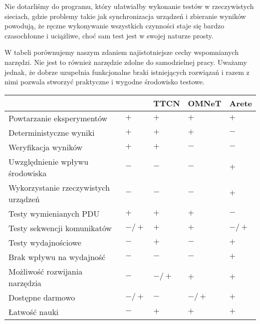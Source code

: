 \documentclass[00-praca-magisterska.tex]{subfiles}
\begin{document}
Nie dotarliśmy do programu, który ułatwiałby wykonanie testów w
rzeczywistych sieciach, gdzie problemy takie jak synchronizacja urządzeń i
zbieranie wyników powodują, że ręczne wykonywanie wszystkich czynności staje
się bardzo czasochłonne i uciążliwe, choć sam test jest w swojej naturze prosty.

W tabeli  porównujemy naszym zdaniem najistotniejsze cechy
wspomnianych narzędzi.  Nie jest to również narzędzie zdolne do
samodzielnej pracy. Uważamy jednak, że dobrze uzupełnia funkcjonalne braki
istniejących rozwiązań i razem z nimi pozwala stworzyć praktyczne i
wygodne środowisko testowe.

\begin{small}
\begin{center}
   \begin{tabular}{ l || C{1.1cm} | C{1.1cm} | C{1.1cm} | C{1.1cm}   }
      \hline
      & \small{\parbox[top][2.4em][c]{1.1cm}{}} & \small{TTCN} & \small{OMNeT} & \small{Arete} \\
      \hline
      Powtarzanie eksperymentów & $+$ & $+$ & $+$ & $+$ \\
      \hline
      Deterministyczne wyniki & $+$ & $+$ & $+$ & $-$ \\
      \hline
      Weryfikacja wyników & $+$ & $+$ & $-$ & $-$ \\
      \hline
      Uwzględnienie wpływu środowiska & $-$ & $-$ & $-$ & $+$ \\
      \hline
      Wykorzystanie rzeczywistych urządzeń & $-$ & $-$ & $-$ & $+$ \\
      \hline
      Testy wymienianych PDU & $+$ & $+$ & $+$ & $-$ \\
      \hline
      Testy sekwencji komunikatów & $-/+$ & $+$ & $+$ & $-/+$ \\
      \hline
      Testy wydajnościowe & $-$ & $+$ & $-$ & $+$ \\
      \hline
      Brak wpływu na wydajność & $-$ & $-$ & $-$ & $+$ \\
      \hline
      Możliwość rozwijania narzędzia & $-$ & $-/+$ & $+$ & $+$ \\
      \hline
      Dostępne darmowo & $-/+$ & $-$ & $-/+$ & $+$ \\
      \hline
      Łatwość nauki & $-$ &  $+$ & $+$ & $+$ \\
      \hline

  \end{tabular}
\end{center}
\end{small}
\end{document}

